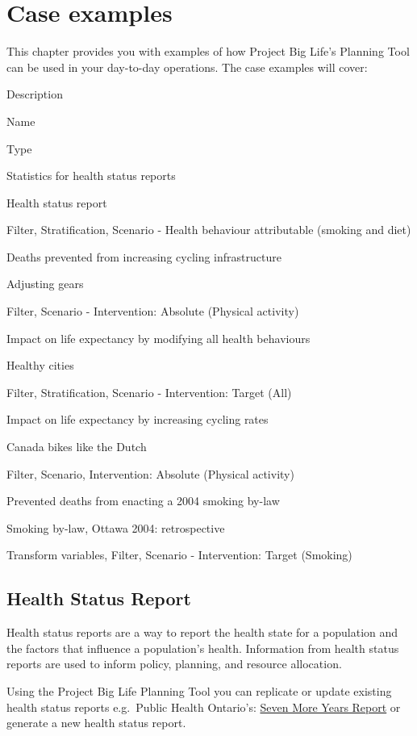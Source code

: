 \documentclass[]{book}
\begin{document}
\chapter{Case examples}\label{caseexamples}

This chapter provides you with examples of how Project Big Life's
Planning Tool can be used in your day-to-day operations. The case
examples will cover:

Description

Name

Type

Statistics for health status reports

Health status report

Filter, Stratification, Scenario - Health behaviour attributable
(smoking and diet)

Deaths prevented from increasing cycling infrastructure

Adjusting gears

Filter, Scenario - Intervention: Absolute (Physical activity)

Impact on life expectancy by modifying all health behaviours

Healthy cities

Filter, Stratification, Scenario - Intervention: Target (All)

Impact on life expectancy by increasing cycling rates

Canada bikes like the Dutch

Filter, Scenario, Intervention: Absolute (Physical activity)

Prevented deaths from enacting a 2004 smoking by-law

Smoking by-law, Ottawa 2004: retrospective

Transform variables, Filter, Scenario - Intervention: Target (Smoking)

\section{Health Status Report}\label{health-status-report}

Health status reports are a way to report the health state for a
population and the factors that influence a population's health.
Information from health status reports are used to inform policy,
planning, and resource allocation.

Using the Project Big Life Planning Tool you can replicate or update
existing health status reports e.g.~Public Health Ontario's:
\href{https://www.ices.on.ca/Publications/Atlases-and-Reports/2012/Seven-More-Years}{Seven
More Years Report} or generate a new health status report.
\end{document}
